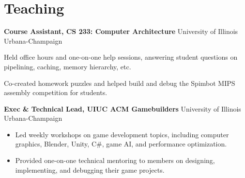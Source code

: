 \section{Teaching}

\noindent\textbf{Course Assistant, CS 233: Computer Architecture} \hfill University of Illinois Urbana-Champaign\\
\begin{itemize}[leftmargin=0.15in]
\small{
  \item Held office hours and one-on-one help sessions, answering student questions on pipelining, caching, memory hierarchy, etc.
  \item Co-created homework puzzles and helped build and debug the Spimbot MIPS assembly competition for students.
}
\end{itemize}

\noindent\textbf{Exec \& Technical Lead, UIUC ACM Gamebuilders} \hfill University of Illinois Urbana-Champaign\\
\begin{itemize}[leftmargin=0.15in]
  \item Led weekly workshops on game development topics, including computer graphics, Blender, Unity, C\#, game AI, and performance optimization.
  \item Provided one-on-one technical mentoring to members on designing, implementing, and debugging their game projects.

\end{itemize}